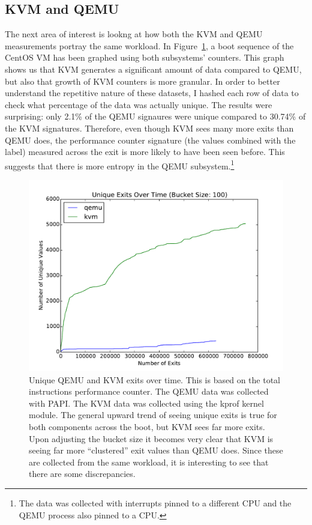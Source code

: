 \documentclass[notitlepage]{article}
\begin{document}
\subsection{KVM and QEMU}
The next area of interest is lookng at how both the KVM and QEMU measurements
portray the same workload. In Figure~\ref{fig:qemukvm}, a boot sequence of the
CentOS VM has been graphed using both subsystems' counters. This graph shows us
that KVM generates a significant amount of data compared to QEMU, but also that
growth of KVM counters is more granular. In order to better understand the
repetitive nature of these datasets, I hashed each row of data to check what
percentage of the data was actually unique. The results were surprising: only
2.1\% of the QEMU signaures were unique compared to 30.74\% of the KVM
signatures. Therefore, even though KVM sees many more exits than QEMU does, the
performance counter signature (the values combined with the label) measured
across the exit is more likely to have been seen before. This suggests that
there is more entropy in the QEMU subsystem.\footnote{The data was collected with
    interrupts pinned to a different CPU and the QEMU process also pinned to a
CPU.}

\begin{figure}[htpb!]
\centering
\includegraphics[width=1\textwidth]{qemu_kvm_overtime.pdf}
\caption{Unique QEMU and KVM exits over time. This is based on the total
instructions performance counter. The QEMU data was collected with PAPI. The KVM
data was collected using the kprof kernel module. The general upward trend of
seeing unique exits is true for both components across the boot, but KVM sees
far more exits. Upon adjusting the bucket size it becomes very clear that KVM
is seeing far more ``clustered'' exit values than QEMU does. Since these are
collected from the same workload, it is interesting to see that there are some
discrepancies.}
\label{fig:qemukvm}
\end{figure}
\end{document}
